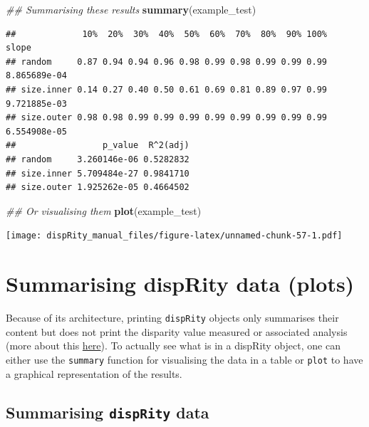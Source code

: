 \documentclass[]{book}
\newenvironment{Shaded}{\begin{snugshade}}{\end{snugshade}}
\newcommand{\CommentTok}[1]{\textcolor[rgb]{0.56,0.35,0.01}{\textit{#1}}}
\newcommand{\KeywordTok}[1]{\textcolor[rgb]{0.13,0.29,0.53}{\textbf{#1}}}
\newcommand{\NormalTok}[1]{#1}
\begin{document}
\begin{Shaded}
\begin{Highlighting}[]
\CommentTok{## Summarising these results}
\KeywordTok{summary}\NormalTok{(example_test)}
\end{Highlighting}
\end{Shaded}

\begin{verbatim}
##             10%  20%  30%  40%  50%  60%  70%  80%  90% 100%        slope
## random     0.87 0.94 0.94 0.96 0.98 0.99 0.98 0.99 0.99 0.99 8.865689e-04
## size.inner 0.14 0.27 0.40 0.50 0.61 0.69 0.81 0.89 0.97 0.99 9.721885e-03
## size.outer 0.98 0.98 0.99 0.99 0.99 0.99 0.99 0.99 0.99 0.99 6.554908e-05
##                 p_value  R^2(adj)
## random     3.260146e-06 0.5282832
## size.inner 5.709484e-27 0.9841710
## size.outer 1.925262e-05 0.4664502
\end{verbatim}

\begin{Shaded}
\begin{Highlighting}[]
\CommentTok{## Or visualising them}
\KeywordTok{plot}\NormalTok{(example_test)}
\end{Highlighting}
\end{Shaded}

\texttt{[image: dispRity\_manual\_files/figure-latex/unnamed-chunk-57-1.pdf]}

\hypertarget{summarising-disprity-data-plots}{%
\section{Summarising dispRity data (plots)}\label{summarising-disprity-data-plots}}

Because of its architecture, printing \texttt{dispRity} objects only summarises their content but does not print the disparity value measured or associated analysis (more about this \protect\hyperlink{manipulating-dispRity-objects}{here}).
To actually see what is in a dispRity object, one can either use the \texttt{summary} function for visualising the data in a table or \texttt{plot} to have a graphical representation of the results.

\hypertarget{summarising-disprity-data}{%
\subsection{\texorpdfstring{Summarising \texttt{dispRity} data}{Summarising dispRity data}}\label{summarising-disprity-data}}
\end{document}
